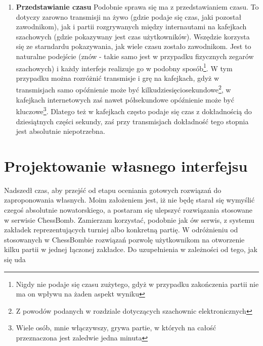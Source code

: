 \documentclass[12pt,leqno]{article}
\begin{document}
\begin{enumerate}
\item {\bf Przedstawianie czasu}
Podobnie sprawa się ma z przedstawianiem czasu. To dotyczy zarowno transmisji na żywo (gdzie podaje się czas, jaki pozostał zawodnikom), jak i partii rozgrywanych między internautami na kafejkach szachowych (gdzie pokazywany jest czas użytkowników). Wszędzie korzysta się ze starndardu pokazywania, jak wiele czasu zostało zawodnikom. Jest to naturalne podejście (znów - takie samo jest w przypadku fizycznych zegarów szachowych) i każdy interfejs realizuje go w podobny sposób\footnote{Nigdy nie podaje się czasu zużytego, gdyż w przypadku zakończenia partii nie ma on wpływu na żaden aspekt wyniku}. W tym przypadku można rozróżnić transmisje i grę na kafejkach, gdyż w transmisjach samo opóźnienie może być kilkudziesięciosekundowe\footnote{Z powodów podanych w rozdziale dotyczących szachownic elektronicznych}, w kafejkach internetowych zaś nawet półsekundowe opóźnienie może być kluczowe\footnote{Wiele osób, mnie włączywszy, grywa partie, w których na całość przeznaczona jest zaledwie jedna minuta}. Dlatego też w kafejkach często podaje się czas z dokładnością do dziesiątnych części sekundy, zaś przy transmisjach dokładność tego stopnia jest absolutnie niepotrzebna. 
\end{enumerate}

\newpage
\section{Projektowanie własnego interfejsu}
Nadszedł czas, aby przejść od etapu oceniania gotowych rozwiązań do zaproponowania własnych. Moim założeniem jest, iż nie będę starał się wymyślić czegoś absolutnie nowatorskiego, a postaram się ulepszyć rozwiązania stosowane w serwisie ChessBomb. Zamierzam korzystać, podobnie jak ów serwis, z systemu zakładek reprezentujących turniej albo konkretną partię. W odróżnieniu od stosowanych w ChessBombie rozwiązań pozwolę użytkownikom na otworzenie kilku partii w jednej łączonej zakładce. {Do uzupełnienia w zależności od tego, jak się uda} 
\end{document}
